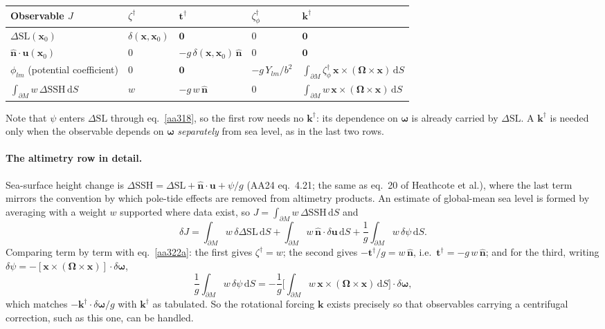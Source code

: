 \documentclass[11pt,a4paper]{article}
\newcommand{\bO}{\bm{\Omega}}
\newcommand{\bw}{\bm{\omega}}
\newcommand{\bx}{\mathbf{x}}
\newcommand{\bu}{\mathbf{u}}
\newcommand{\bt}{\mathbf{t}}
\newcommand{\bk}{\mathbf{k}}
\newcommand{\bn}{\hat{\mathbf{n}}}
\newcommand{\dSL}{\Delta\mathrm{SL}}
\newcommand{\dd}{\,\mathrm{d}}
\newcommand{\pM}{\partial M}
\begin{document}
\begin{center}
\begin{tabular}{@{}lllll@{}}
\toprule
Observable $J$ & $\zeta^\dagger$ & $\bt^\dagger$ & $\zeta_\phi^\dagger$ & $\bk^\dagger$\\
\midrule
$\dSL(\bx_0)$ & $\delta(\bx,\bx_0)$ & $\mathbf{0}$ & $0$ & $\mathbf{0}$\\[2pt]
$\bn\cdot\bu(\bx_0)$ & $0$ & $-g\,\delta(\bx,\bx_0)\,\bn$ & $0$ & $\mathbf{0}$\\[2pt]
$\phi_{lm}$ (potential coefficient) & $0$ & $\mathbf{0}$ & $-g\,Y_{lm}/b^2$ & $\int_{\pM}\zeta^\dagger_\phi\,\bx\times(\bO\times\bx)\dd S$\\[2pt]
$\int_{\pM}w\,\Delta\mathrm{SSH}\dd S$ & $w$ & $-g\,w\,\bn$ & $0$ & $\int_{\pM}w\,\bx\times(\bO\times\bx)\dd S$\\
\bottomrule
\end{tabular}
\end{center}

Note that $\psi$ enters $\dSL$ through eq.~\eqref{aa318}, so the first row needs no $\bk^\dagger$:
its dependence on $\bw$ is already carried by $\dSL$. A $\bk^\dagger$ is needed only when the
observable depends on $\bw$ \emph{separately} from sea level, as in the last two rows.

\paragraph{The altimetry row in detail.} Sea-surface height change is
$\Delta\mathrm{SSH}=\dSL+\bn\cdot\bu+\psi/g$ (AA24 eq.~4.21; the same as eq.~20 of Heathcote et al.),
where the last term mirrors the convention by which pole-tide effects are removed from altimetry
products. An estimate of global-mean sea level is formed by averaging with a weight $w$ supported
where data exist, so $J=\int_{\pM}w\,\Delta\mathrm{SSH}\dd S$ and
\begin{equation*}
  \delta J=\int_{\pM}w\,\delta\dSL\dd S+\int_{\pM}w\,\bn\cdot\delta\bu\dd S+\frac1g\int_{\pM}w\,\delta\psi\dd S .
\end{equation*}
Comparing term by term with eq.~\eqref{aa322a}: the first gives $\zeta^\dagger=w$; the second gives
$-\bt^\dagger/g=w\,\bn$, i.e.\ $\bt^\dagger=-g\,w\,\bn$; and for the third, writing
$\delta\psi=-[\bx\times(\bO\times\bx)]\cdot\delta\bw$,
\begin{equation*}
  \frac1g\int_{\pM}w\,\delta\psi\dd S=-\frac1g\Big[\int_{\pM}w\,\bx\times(\bO\times\bx)\dd S\Big]\cdot\delta\bw ,
\end{equation*}
which matches $-\bk^\dagger\cdot\delta\bw/g$ with $\bk^\dagger$ as tabulated. So the rotational
forcing $\bk$ exists precisely so that observables carrying a centrifugal correction, such as this
one, can be handled.
\end{document}

